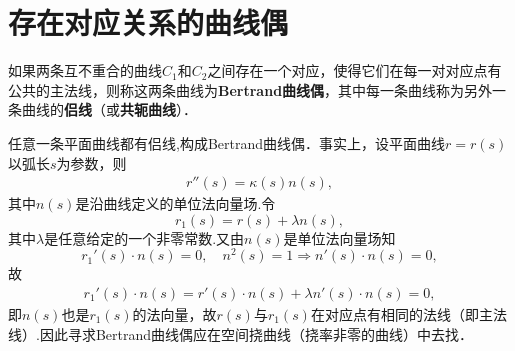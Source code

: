 \documentclass[../../main.tex]{subfiles}%
\begin{document}
\section{存在对应关系的曲线偶}

\begin{definition}[Bertrand曲线偶]
如果两条互不重合的曲线$C_1$和$C_2$之间存在一个对应，使得它们在每一对对应点有公共的主法线，则称这两条曲线为\textbf{Bertrand曲线偶}，其中每一条曲线称为另外一条曲线的\textbf{侣线}（或\textbf{共轭曲线}）．
\end{definition}
\begin{remark}
任意一条平面曲线都有侣线,构成Bertrand曲线偶．事实上，设平面曲线$r=r(s)$以弧长$s$为参数，则
\begin{align*}
r''(s)=\kappa(s)n(s),
\end{align*}
其中$n(s)$是沿曲线定义的单位法向量场.令$$r_1(s)=r(s)+\lambda n(s),$$
其中$\lambda$是任意给定的一个非零常数.又由$n(s)$是单位法向量场知
$$r_1'(s)\cdot n(s)=0,\quad n^2(s)=1\Longrightarrow n'(s)\cdot n(s)=0,$$
故
\begin{align*}
r_1'(s)\cdot n(s)= r'(s)\cdot n(s)+\lambda n'(s)\cdot n(s)=0,
\end{align*}
即$n(s)$也是$r_1(s)$的法向量，故$r(s)$与$r_1(s)$在对应点有相同的法线（即主法线）.因此寻求Bertrand曲线偶应在空间挠曲线（挠率非零的曲线）中去找．
\end{remark}
\end{document}
